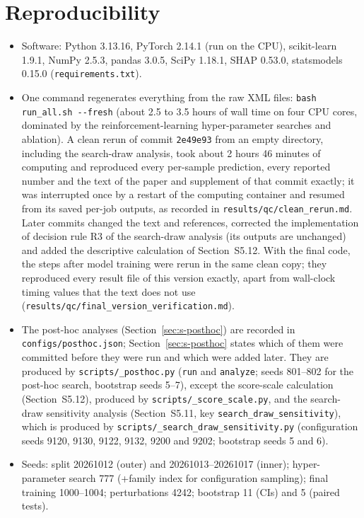 \section{Reproducibility}
\label{sec:s-repro}
\begin{itemize}
\item Software: Python 3.13.16, PyTorch 2.14.1 (run on the CPU), scikit-learn 1.9.1, NumPy 2.5.3, pandas 3.0.5, SciPy 1.18.1, SHAP 0.53.0, statsmodels 0.15.0 (\texttt{requirements.txt}).
\item One command regenerates everything from the raw XML files: \texttt{bash run\_all.sh -{}-fresh} (about 2.5 to 3.5 hours of wall time on four CPU cores, dominated by the reinforcement-learning hyper-parameter searches and ablation). A clean rerun of commit \texttt{2e49e93} from an empty directory, including the search-draw analysis, took about 2 hours 46 minutes of computing and reproduced every per-sample prediction, every reported number and the text of the paper and supplement of that commit exactly; it was interrupted once by a restart of the computing container and resumed from its saved per-job outputs, as recorded in \texttt{results/\allowbreak qc/\allowbreak clean\_rerun.md}. Later commits changed the text and references, corrected the implementation of decision rule R3 of the search-draw analysis (its outputs are unchanged) and added the descriptive calculation of Section~S5.12. With the final code, the steps after model training were rerun in the same clean copy; they reproduced every result file of this version exactly, apart from wall-clock timing values that the text does not use (\texttt{results/\allowbreak qc/\allowbreak final\_version\_verification.md}).
\item The post-hoc analyses (Section~\ref{sec:s-posthoc}) are recorded in \texttt{configs/\allowbreak posthoc.json}; Section~\ref{sec:s-posthoc} states which of them were committed before they were run and which were added later. They are produced by \texttt{scripts/\_posthoc.py} (\texttt{run} and \texttt{analyze}; seeds 801--802 for the post-hoc search, bootstrap seeds 5--7), except the score-scale calculation (Section~S5.12), produced by \texttt{scripts/\_score\_scale.py}, and the search-draw sensitivity analysis (Section~S5.11, key \texttt{search\_draw\_sensitivity}), which is produced by \texttt{scripts/\_search\_draw\_sensitivity.py} (configuration seeds 9120, 9130, 9122, 9132, 9200 and 9202; bootstrap seeds 5 and 6).
\item Seeds: split 20261012 (outer) and 20261013--20261017 (inner); hyper-parameter search 777 (+family index for configuration sampling); final training 1000--1004; perturbations 4242; bootstrap 11 (CIs) and 5 (paired tests).

\end{itemize}
